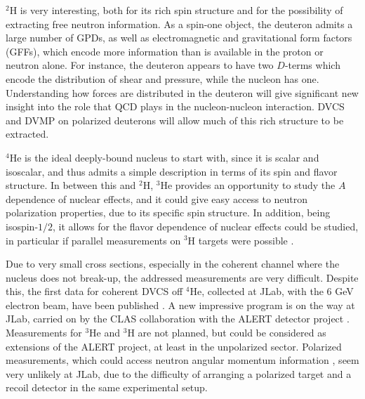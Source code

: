 
$^2$H is very interesting, both for its rich spin structure
and for the possibility of extracting free neutron information.
As a spin-one object, the deuteron admits a large number of GPDs,
as well as electromagnetic and gravitational form factors (GFFs),
which encode more information than is available in the proton or neutron alone.
For instance, the deuteron appears to have two $D$-terms which encode
the distribution of shear and pressure, while the nucleon has one.
Understanding how forces are distributed in the deuteron
will give significant new insight into the role that QCD plays
in the nucleon-nucleon interaction. DVCS and DVMP on polarized deuterons
will allow much of this rich structure to be extracted.

$^4$He is the ideal deeply-bound nucleus to start with,
since it is scalar and isoscalar, and thus admits a simple
description in terms of its spin and flavor structure.
In between this and $^2$H, $^3$He provides an opportunity
to study the $A$ dependence of nuclear effects, and
it could give easy access to neutron polarization properties,
due to its specific spin structure.
In addition, being isospin-$1/2$, it allows for the
flavor dependence of nuclear effects could be studied, 
in particular if parallel measurements 
on $^3$H targets were possible \cite{Scopetta:2009sn}.

Due to very small cross sections,
especially in the coherent channel where the nucleus does not break-up,
the addressed measurements are very difficult.
Despite this, the first data for coherent DVCS off $^4$He,
collected at JLab, with the 6 GeV electron beam,
have been published \cite{Hattawy:2017woc}.
A new impressive program is on the way at JLab,
carried on by the CLAS collaboration with the ALERT detector project 
\cite{Armstrong:2017wfw,Armstrong:2017zcm,Armstrong:2017zqr}.
Measurements for $^3$He and $^3$H
are not planned, but could be considered
as extensions of the ALERT project, at least in the unpolarized 
sector. Polarized measurements, which could
access neutron angular momentum information \cite{Rinaldi:2012pj,
Rinaldi:2012ft,Rinaldi:2014bba}, seem
very unlikely at JLab, due to the difficulty of arranging
a polarized target and a recoil detector in the same experimental setup. 

